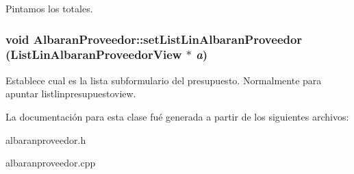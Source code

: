 Pintamos los totales. 
\subsubsection{\setlength{\rightskip}{0pt plus 5cm}void Albaran\-Proveedor::set\-List\-Lin\-Albaran\-Proveedor ({\bf List\-Lin\-Albaran\-Proveedor\-View} $\ast$ {\em a})\hspace{0.3cm}{\tt  [inline]}}\label{classAlbaranProveedor_a26}


Establece cual es la lista subformulario del presupuesto. Normalmente para apuntar listlinpresupuestoview. 

La documentaci\'{o}n para esta clase fu\'{e} generada a partir de los siguientes archivos:\begin{CompactItemize}
\item 
albaranproveedor.h\item 
albaranproveedor.cpp\end{CompactItemize}
